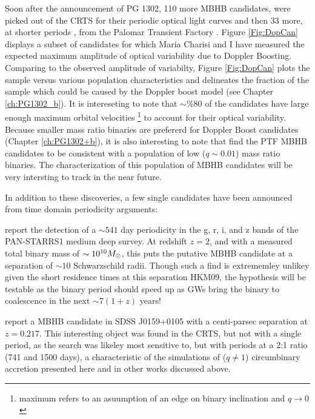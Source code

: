 Soon after the announcement of PG 1302, 110 more MBHB candidates, were picked
out of the CRTS for their periodic optical light curves \citep{Graham+2015b}
and then 33 more, at shorter periods \citep{Charisi+2016}, from the Palomar
Transient Factory \citep[PTF][]{Rau:2009, Law:2009}. Figure \ref{Fig:DopCan}
displays a subset of candidates for which Maria Charisi and I have measured
the expected maximum amplitude of optical variability due to Doppler Boosting.
Comparing to the observed amplitude of variabilty, Figure \ref{Fig:DopCan}
plots the sample versus various population characteristics and delineates the
fraction of the sample which could be caused by the Doppler boost model (see
Chapter \ref{ch:PG1302_b}). It is intereseting to note that $\sim \% 80$ of
the candidates have large enough maximum orbital velocities \footnote{maximum
refers to an asuumption of an edge on binary inclination and $q \rightarrow
0$} to account for their optical variability. Because smaller mass ratio
binaries are prefererd for Doppler Boost candidates (Chapter
\ref{ch:PG1302+b}), it is also interesting to note that \citep{Charisi+2016}
find the PTF MBHB candidates to be consistent with a population of low
($q\sim0.01$) mass ratio binaries. The characterization of this population of
MBHB candidates will be very intersting to track in the near future.


In addition to these discoveries, a few single candidates have been announced
from time domain periodicity arguments: 

\citep{Liu:7pc:2015} report the detection of a $\sim 541$ day periodicity in
the g, r, i, and z bands of the PAN-STARRS1 medium deep survey. At redshift
$z=2$, and with a measured total binary mass of $\sim 10^{10} {M_{\odot}}$, this
puts the putative MBHB candidate at a separation of $\sim10$ Schwarzschild
radii. Though such a find is extrememley unlikey given the short residence
times at this separation HKM09, the hypothesis will be testable as the binary
period should speed up as GWs bring the binary to coalescence in the next
$\sim 7 (1+z)$ years!


\citep{Zheng:MBHB_2P:2015} report a MBHB candidate in SDSS J0159+0105 with a
centi-parsec separation at $z=0.217$. This interesting object was found in the
CRTS, but not with a single period, as the \citep{Graham+2015b} search was
likeley most sensitive to, but with periods at a 2:1 ratio (741 and 1500
days), a characteristic of the simulations of ($q \neq 1$) circumbinary
accretion presented here and in other works discussed above.


